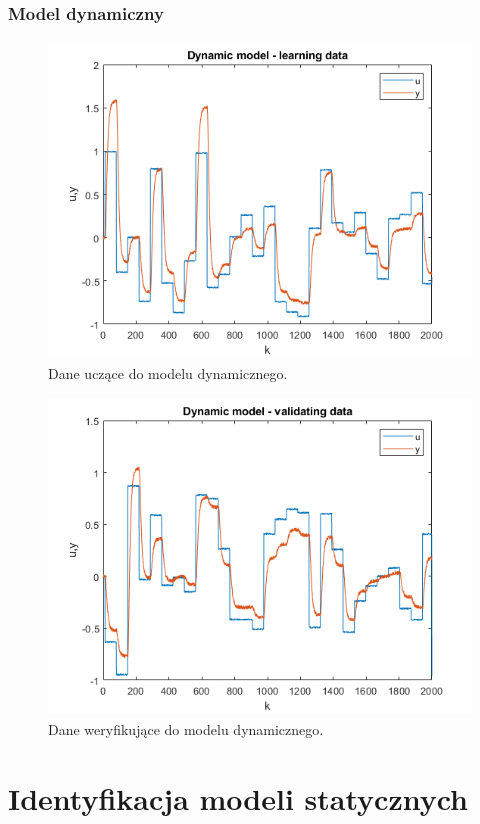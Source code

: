 \subsubsection{Model dynamiczny}
\begin{figure}[H]
\centering
\includegraphics[width=15cm]{images/23.png}
\caption{Dane uczące do modelu dynamicznego.}
\label{fig:2}
\end{figure}
\begin{figure}[H]
\centering
\includegraphics[width=15cm]{images/24.png}
\caption{Dane weryfikujące do modelu dynamicznego.}
\label{fig:3}
\end{figure}
\section{Identyfikacja modeli statycznych}
